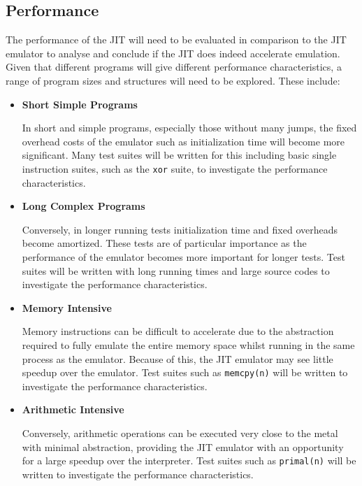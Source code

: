 \subsection{Performance}

The performance of the JIT will need to be evaluated in comparison to the JIT emulator to analyse and conclude if the JIT does indeed accelerate emulation. Given that different programs will give different performance characteristics, a range of program sizes and structures will need to be explored. These include:

\begin{itemize}
    \item \textbf{Short Simple Programs}
    
    In short and simple programs, especially those without many jumps, the fixed overhead costs of the emulator such as initialization time will become more significant. Many test suites will be written for this including basic single instruction suites, such as the \texttt{xor} suite, to investigate the performance characteristics.
    
    \item \textbf{Long Complex Programs}
    
    Conversely, in longer running tests initialization time and fixed overheads become amortized. These tests are of particular importance as the performance of the emulator becomes more important for longer tests. Test suites will be written with long running times and large source codes to investigate the performance characteristics.

    \item \textbf{Memory Intensive}
    
    Memory instructions can be difficult to accelerate due to the abstraction required to fully emulate the entire memory space whilst running in the same process as the emulator. Because of this, the JIT emulator may see little speedup over the emulator. Test suites such as \texttt{memcpy(n)} will be written to investigate the performance characteristics.

    \item \textbf{Arithmetic Intensive}
    
    Conversely, arithmetic operations can be executed very close to the metal with minimal abstraction, providing the JIT emulator with an opportunity for a large speedup over the interpreter. Test suites such as \texttt{primal(n)} will be written to investigate the performance characteristics.


\end{itemize}

